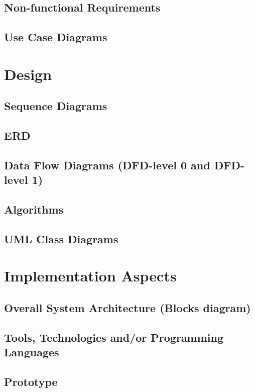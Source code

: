 \documentclass{book}
\begin{document}
		\section{Non-functional Requirements}
		
		\section{Use Case Diagrams}
	
	\chapter{Design}
		\section{Sequence Diagrams}
		
		\section{ERD}
		
		\section{Data Flow Diagrams (DFD-level 0 and DFD-level 1)}
		
		\section{Algorithms}
		
		\section{UML Class Diagrams}
	
	\chapter{Implementation Aspects}
		\section{Overall System Architecture (Blocks diagram)}
		
		\section{Tools, Technologies and/or Programming Languages}
		
		\section{Prototype}
	
\end{document}
